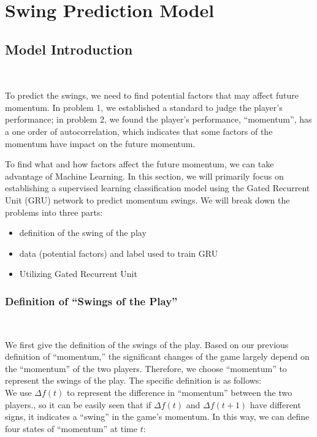 \section{Swing Prediction Model}

\subsection{Model Introduction}~{}

To predict the swings, we need to find potential factors that may affect future momentum.
In problem 1, we established a standard to judge the player's performance;
in problem 2, we found the player's performance, ``momentum'', has a one order of autocorrelation,
which indicates that some factors of the momentum have impact on the future momentum.

To find what and how factors affect the future momentum, we can take advantage 
of Machine Learning. In this section, we will primarily focus on establishing a 
supervised learning classification model using the Gated Recurrent Unit (GRU) network to 
predict momentum swings. We will break down the problems into three parts:

\begin{itemize}
    \item definition of the swing of the play
    \item data (potential factors) and label used to train GRU
    \item Utilizing Gated Recurrent Unit
\end{itemize}

\subsubsection{Definition of ``Swings of the Play''}~{}

We first give the definition of the swings of the play.
Based on our previous definition of ``momentum,'' the significant changes of the game 
largely depend on the ``momentum'' of the two players. Therefore, we choose ``momentum'' to represent 
the swings of the play. The specific definition is as follows:\\

We use $\Delta f(t)$ to represent the difference in ``momentum'' between the two players., 
so it can be easily seen that if $\Delta f(t)$ and $\Delta f(t+1)$
have different signs, it indicates a ``swing'' in the game's momentum. 
In this way, we can define four states of ``momentum'' at time $t$:


